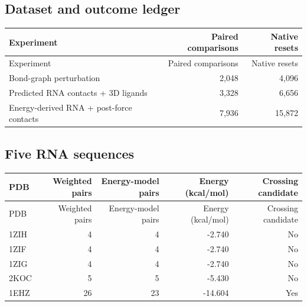 \documentclass[10pt,a4paper]{article}
\begin{document}
\subsection{Dataset and outcome ledger}
\begin{center}\small\begin{longtable}{lrr}
\toprule
Experiment & Paired comparisons & Native resets\\
\midrule
\endfirsthead
\toprule
Experiment & Paired comparisons & Native resets\\
\midrule
\endhead
Bond-graph perturbation & 2,048 & 4,096\\
Predicted RNA contacts + 3D ligands & 3,328 & 6,656\\
Energy-derived RNA + post-force contacts & 7,936 & 15,872\\
\bottomrule
\end{longtable}
\end{center}
\subsection{Five RNA sequences}
\begin{center}\small\begin{longtable}{lrrrr}
\toprule
PDB & Weighted pairs & Energy-model pairs & Energy (kcal/mol) & Crossing candidate\\
\midrule
\endfirsthead
\toprule
PDB & Weighted pairs & Energy-model pairs & Energy (kcal/mol) & Crossing candidate\\
\midrule
\endhead
1ZIH & 4 & 4 & -2.740 & No\\
1ZIF & 4 & 4 & -2.740 & No\\
1ZIG & 4 & 4 & -2.740 & No\\
2KOC & 5 & 5 & -5.430 & No\\
1EHZ & 26 & 23 & -14.604 & Yes\\
\bottomrule
\end{longtable}
\end{center}
\end{document}
